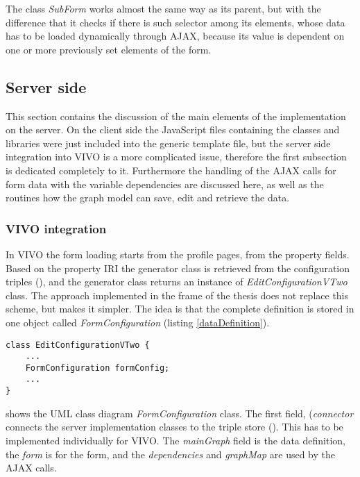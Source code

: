 The class \textit{SubForm} works almost the same way as its parent, but with the difference that it checks if there is such selector among its elements, whose data has to be loaded dynamically through AJAX, because its value is dependent on one or more previously set elements of the form.  

\newpage
\subsection{Server side} 

This section contains the discussion of the main elements of the implementation on the server. On the client side the JavaScript files containing the classes and libraries were just included into the generic template file, but the server side integration into VIVO is a more complicated issue, therefore the first subsection is dedicated completely to it. Furthermore the handling of the AJAX calls for form data with the variable dependencies are discussed here, as well as the routines how the graph model can save, edit and retrieve the data.

\subsubsection{VIVO integration}

In VIVO the form loading starts from the profile pages, from the property fields. Based on the property IRI the generator class is retrieved from the configuration triples (), and the generator class returns an instance of \textit{EditConfigurationVTwo} class. The approach implemented in the frame of the thesis does not replace this scheme, but makes it simpler. The idea is that the complete definition is stored in one object called \textit{FormConfiguration} (listing \ref{dataDefinition}).

\begin{lstlisting}[basicstyle=\footnotesize, frame=single, caption={Added field to the VIVO configuration class}, label=dataDefinition, captionpos=b, belowskip=1em, aboveskip=2em]
class EditConfigurationVTwo {
	...
	FormConfiguration formConfig;
	...
}
\end{lstlisting}

 shows the UML class diagram \textit{FormConfiguration} class. The first field, (\textit{connector} connects the server implementation classes to the triple store (). This has to be implemented individually for VIVO. The \textit{mainGraph} field is the data definition, the \textit{form} is for the form, and the \textit{dependencies} and \textit{graphMap} are used by the AJAX calls. 

